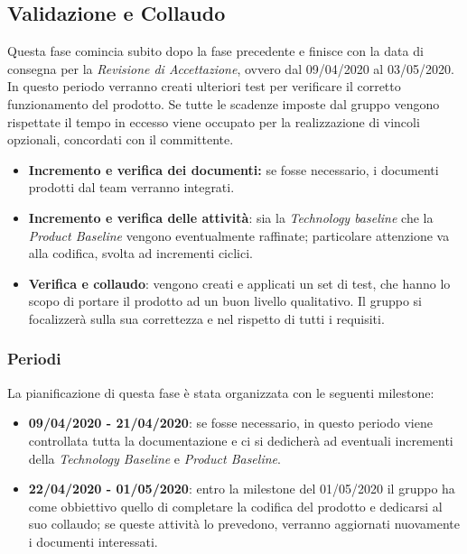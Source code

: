 \subsection{Validazione e Collaudo}
Questa fase comincia subito dopo la fase precedente e finisce con la data di consegna per la \textit{Revisione di Accettazione}, ovvero dal 09/04/2020 al 03/05/2020.\\
In questo periodo verranno creati ulteriori test per verificare il corretto funzionamento del prodotto. Se tutte le scadenze imposte dal gruppo vengono rispettate il tempo in eccesso viene occupato per la realizzazione di vincoli opzionali, concordati con il committente. 

\begin{itemize}
\item \textbf{Incremento e verifica dei documenti:} se fosse necessario, i documenti prodotti dal team verranno integrati.

 \item \textbf{Incremento e verifica delle attività}: sia la \textit{Technology baseline} che la \textit{Product Baseline} vengono eventualmente raffinate; particolare attenzione va alla codifica, svolta ad incrementi ciclici.

 \item \textbf{Verifica e collaudo}: vengono creati e applicati un set di test, che hanno lo scopo di portare il prodotto ad un buon livello qualitativo. Il gruppo si focalizzerà sulla sua correttezza e nel rispetto di tutti i requisiti.
\end{itemize}

\subsubsection{Periodi}
La pianificazione di questa fase è stata organizzata con le seguenti milestone:

\begin{itemize}
\item \textbf{09/04/2020 - 21/04/2020}: se fosse necessario, in questo periodo viene controllata tutta la documentazione e ci si dedicherà ad eventuali incrementi della \textit{Technology Baseline} e \textit{Product Baseline}.

\item \textbf{22/04/2020 - 01/05/2020}: entro la milestone del 01/05/2020 il gruppo ha come obbiettivo quello di completare la codifica del prodotto e dedicarsi al suo collaudo; se queste attività lo prevedono, verranno aggiornati nuovamente i documenti interessati.

\end{itemize}
